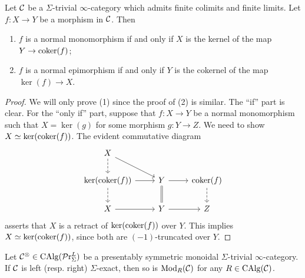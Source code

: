 \documentclass[10pt,a4paper,oneside]{article}
\begin{document}
\begin{prop}\label{kerofcoker}
Let $\mathcal{C}$ be a $\Sigma$-trivial $\infty$-category which admits finite colimits and finite limits. Let $f: X\to Y$ be a morphism in $\mathcal{C}$. Then
\begin{enumerate}
\item $f$ is a normal monomorphism if and only if $X$ is the kernel of the map $Y\to \operatorname{coker}(f)$;
\item $f$ is a normal epimorphism if and only if $Y$ is the cokernel of the map $\ker(f)\to X$.
\end{enumerate}
\end{prop}
\begin{proof}
We will only prove (1) since the proof of (2) is similar. The ``if'' part is clear. For the ``only if'' part, suppose that $f: X\to Y$ be a normal monomorphism such that $X=\ker(g)$ for some morphism $g:Y\to Z$. We need to show $X\simeq\ker(\operatorname{coker}(f))$.
The evident commutative diagram
$$%
\begin{tikzcd}
X \arrow[rd] \arrow[d, dashed]              &                                            &                             \\
\ker(\coker(f)) \arrow[r] \arrow[d, dashed] & Y \arrow[r] \arrow[d,  Rightarrow, no head] & \coker(f) \arrow[d, dashed] \\
X \arrow[r]                                 & Y \arrow[r]                                & Z                          
\end{tikzcd}$$
asserts that $X$ is a retract of $\ker(\operatorname{coker}(f))$ over $Y$. This implies $X\simeq\ker(\operatorname{coker}(f))$, since both are $(-1)$-truncated over $Y$.
\end{proof}
\begin{cor}
Let $\mathcal{C}^\otimes\in\operatorname{CAlg}(\mathcal{P}\mathrm{r}^L_{\Sigma})$ be a presentably symmetric monoidal $\Sigma$-trivial $\infty$-category. If $\mathcal{C}$ is left (resp. right) $\Sigma$-exact, then so is $\operatorname{Mod}_{R}(\mathcal{C})$ for any $R\in\operatorname{CAlg}(\mathcal{C})$.
\end{cor}
\end{document}
